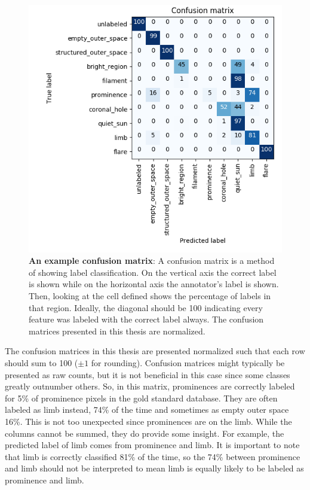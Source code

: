 \documentclass[twoside]{report}
\begin{document}
\begin{figure}[ht]
  \begin{center}
    \includegraphics[scale=0.8]{confusion_matrix_example}
    \caption{{\bf An example confusion matrix}: A confusion matrix is a method of showing label classification. On the vertical axis the correct label is shown while on the horizontal axis the annotator's label is shown. Then, looking at the cell defined shows the percentage of labels in that region. Ideally, the diagonal should be 100 indicating every feature was labeled with the correct label always. The confusion matrices presented in this thesis are normalized.}
    \label{fig:exampleconfusionmatrix}
 \end{center}
\end{figure}

The confusion matrices in this thesis are presented normalized such that each row should sum to 100 ($\pm 1$ for rounding). Confusion matrices might typically be presented as raw counts, but it is not beneficial in this case since some classes greatly outnumber others. So, in this matrix, prominences are correctly labeled for 5\% of prominence pixels in the gold standard database. They are often labeled as limb instead, 74\% of the time and sometimes as empty outer space 16\%. This is not too unexpected since prominences are on the limb. While the columns cannot be summed, they do provide some insight. For example, the predicted label of limb comes from prominence and limb. It is important to note that limb is correctly classified 81\% of the time, so the 74\% between prominence and limb should not be interpreted to mean limb is equally likely to be labeled as prominence and limb. 
\end{document}
